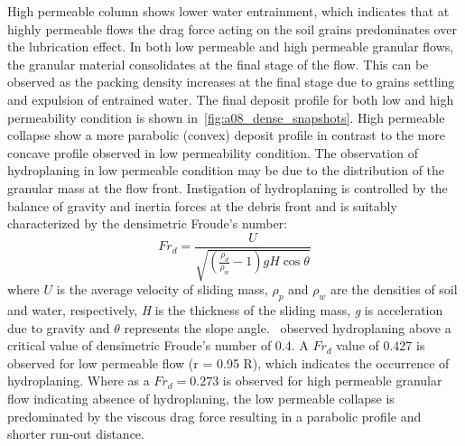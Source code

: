 High permeable column shows lower water entrainment, which indicates that at 
highly permeable flows the drag force acting on the soil grains predominates 
over the lubrication effect. In both low permeable and high permeable granular 
flows, the granular material consolidates at the final stage of the flow. This 
can be observed as the packing density increases at the final stage due to 
grains settling and expulsion of entrained water. The final deposit profile for 
both low and high permeability condition is shown 
in~\cref{fig:a08_dense_snapshots}. High permeable collapse show a more 
parabolic (convex) deposit profile in contrast to the more concave profile 
observed in low permeability condition. The observation of hydroplaning in low 
permeable condition may be due to the distribution of the granular mass at the 
flow front. Instigation of hydroplaning is controlled by the balance of gravity 
and inertia forces at the debris front and is suitably characterized by the 
densimetric Froude's number:
%
\begin{equation}
Fr_d = \frac{U}{\sqrt{(\frac{\rho_d}{\rho_w}-1)gH\cos\theta}}
\end{equation}
where $U$ is the average velocity of sliding mass, $\rho_p$ and $\rho_w$ are 
the densities of soil and water, respectively, \textit{H} is the thickness of 
the sliding mass, \textit{g} is acceleration due to gravity and $\theta$ 
represents the slope angle.~\citet{Harbitz2003,Mohrig1998} observed 
hydroplaning above a critical value of densimetric Froude's number of 0.4. A 
$Fr_d$ value of 0.427 is observed for low permeable flow (r = 0.95 R), which 
indicates the occurrence of hydroplaning. Where as a $Fr_d = 0.273$ is observed 
for high permeable granular flow indicating absence of hydroplaning, the low 
permeable collapse is predominated by the viscous drag force resulting in a 
parabolic profile and shorter run-out distance. 
